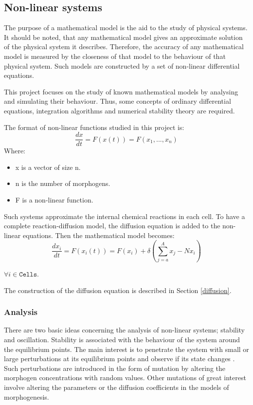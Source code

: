 \subsection{Non-linear systems}
The purpose of a mathematical model is the aid to the study of physical systems. It should be noted, that any mathematical model gives an approximate solution of the physical system it describes. Therefore, the accuracy of any mathematical model is measured by the closeness of that model to the behaviour of that physical system. Such models are constructed by a set of non-linear differential equations.

This project focuses on the study of known mathematical models by analysing and simulating their behaviour. Thus, some concepts of ordinary differential equations, integration algorithms and numerical stability theory are required.

The format of non-linear functions studied in this project is:
$$ \frac{dx}{dt}=F(x(t))=F(x_1, ..., x_n) $$
Where:
\begin{itemize}
\item x is a vector of size n.
\item n is the number of morphogens.
\item F is a non-linear function.
\end{itemize}

Such systems approximate the internal chemical reactions in each cell. To have a complete reaction-diffusion model, the diffusion equation is added to the non-linear equations. Then the mathematical model becomes:
\begin{equation}
\label{morphogenesisgeneralequation}
\frac{dx_i}{dt}=F(x_i(t))=F(x_i) + \delta(\sum_{j=a}^{A} x_j - Nx_i)
\end{equation}

$ \forall i \in \mathtt{Cells} $.

The construction of the diffusion equation is described in Section \ref{diffusion}.
\subsubsection{Analysis}
There are two basic ideas concerning the analysis of non-linear systems; stability and oscillation. Stability is associated with the behaviour of the system around the equilibrium points. The main interest is to penetrate the system with small or large perturbations at its equilibrium points and observe if its state changes \cite{aggarwal_notes_1972}. Such perturbations are introduced in the form of mutation by altering the morphogen concentrations with random values. Other mutations of great interest involve altering the parameters or the diffusion coefficients in the models of morphogenesis.


